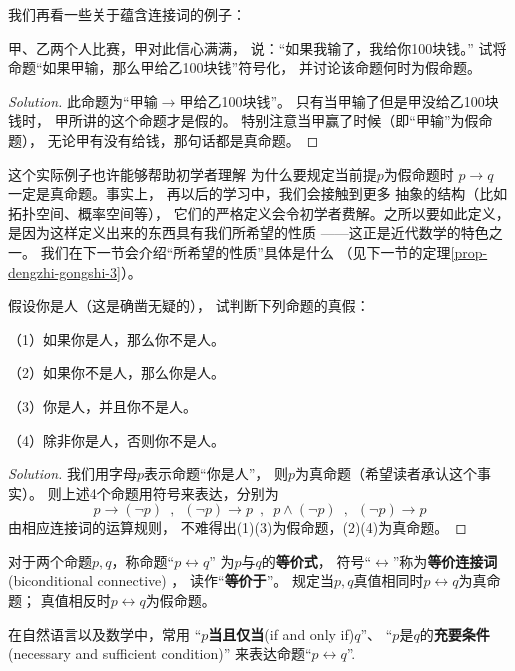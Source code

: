 我们再看一些关于蕴含连接词的例子：

\begin{example}
甲、乙两个人比赛，甲对此信心满满，
说：“如果我输了，我给你100块钱。”
试将命题“如果甲输，那么甲给乙100块钱”符号化，
并讨论该命题何时为假命题。
\end{example}

\begin{proof}[Solution]
此命题为“甲输$\rightarrow$甲给乙100块钱”。
只有当甲输了但是甲没给乙100块钱时，
甲所讲的这个命题才是假的。
特别注意当甲赢了时候（即“甲输”为假命题），
无论甲有没有给钱，那句话都是真命题。
\end{proof}

这个实际例子也许能够帮助初学者理解
为什么要规定当前提$p$为假命题时
$p\rightarrow q$ 一定是真命题。事实上，
再以后的学习中，我们会接触到更多
抽象的结构（比如拓扑空间、概率空间等），
它们的严格定义会令初学者费解。之所以要如此定义，
是因为这样定义出来的东西具有我们所希望的性质
——这正是近代数学的特色之一。
我们在下一节会介绍“所希望的性质”具体是什么
（见下一节的定理\ref{prop-dengzhi-gongshi-3}）。
\begin{example}假设你是人（这是确凿无疑的），
试判断下列命题的真假：

（1）如果你是人，那么你不是人。

（2）如果你不是人，那么你是人。

（3）你是人，并且你不是人。

（4）除非你是人，否则你不是人。
\end{example}

\begin{proof}[Solution]
我们用字母$p$表示命题“你是人”，
则$p$为真命题（希望读者承认这个事实）。
则上述4个命题用符号来表达，分别为
$$p\rightarrow (\neg p)\,\,\,,\,\,\,
(\neg p)\rightarrow p\,\,\,,\,\,\,
p\wedge(\neg p)\,\,\,,\,\,\,
(\neg p)\rightarrow p$$
由相应连接词的运算规则，
不难得出(1)(3)为假命题，(2)(4)为真命题。
\end{proof}

\begin{definition}[等价连接词]
对于两个命题$p,q$，称命题“$p\leftrightarrow q$”
为$p$与$q$的\textbf{等价式}，
符号“$\leftrightarrow$”称为\textbf{等价连接词}(biconditional connective)
，
读作“\textbf{等价于}”。
规定当$p,q$真值相同时$p\leftrightarrow q$为真命题；
真值相反时$p\leftrightarrow q$为假命题。
\end{definition}
在自然语言以及数学中，常用
“$p$\textbf{当且仅当}(if and only if)$q$”、
“$p$是$q$的\textbf{充要条件}(necessary and sufficient condition)”
来表达命题“$p\leftrightarrow q$”.
\vsp

